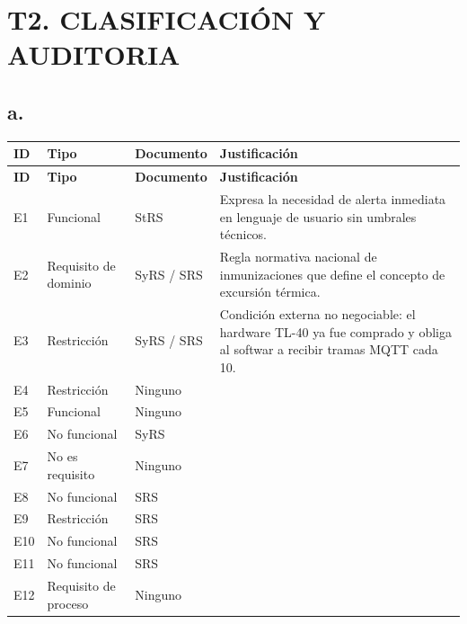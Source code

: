 \documentclass[11pt,a4paper]{article}
\begin{document}

\clearpage
\section*{T2. CLASIFICACIÓN Y AUDITORIA}

\subsection*{a.}

\begingroup
\small
\setlength{\tabcolsep}{4pt}
\renewcommand{\arraystretch}{1.5}

\begin{longtable}{|
p{}|
p{}|
p{}|
p{}|}
\hline
\textbf{ID} &
\textbf{Tipo} &
\textbf{Documento} &
\textbf{Justificación} \\ \hline
\endfirsthead

\hline
\textbf{ID} &
\textbf{Tipo} &
\textbf{Documento} &
\textbf{Justificación} \\ \hline
\endhead

E1 &
Funcional &
StRS &
Expresa la necesidad de alerta inmediata
en lenguaje de usuario sin umbrales
técnicos. \\ \hline

E2 &
Requisito de dominio &
SyRS / SRS &
Regla normativa nacional de inmunizaciones
que define el concepto de excursión
térmica. \\ \hline

E3 &
Restricción &
SyRS / SRS &
Condición externa no negociable:
el hardware TL-40 ya fue comprado
y obliga al softwar a recibir
tramas MQTT cada 10. \\ \hline

E4 &
Restricción &
Ninguno &
\\ \hline

E5 &
Funcional &
Ninguno &
\\ \hline

E6 &
No funcional &
SyRS &
\\ \hline

E7 &
No es requisito &
Ninguno &
\\ \hline

E8 &
No funcional &
SRS &
\\ \hline

E9 &
Restricción &
SRS &
\\ \hline

E10 &
No funcional &
SRS &
\\ \hline

E11 &
No funcional &
SRS &
\\ \hline

E12 &
Requisito de proceso &
Ninguno &
\\ \hline

\end{longtable}
\endgroup
\end{document}
